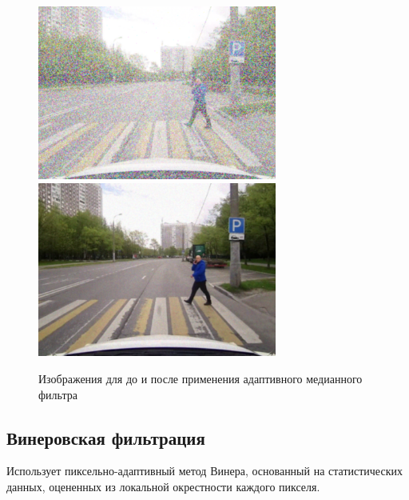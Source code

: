\begin{figure}[ht]
    \centering
    \includegraphics[width=0.7\textwidth]{../outputs/image_impulse_filter.png}
    \includegraphics[width=0.7\textwidth]{../outputs/image_quant_filter.png}
    \caption{Изображения для до и после применения адаптивного медианного фильтра}
    \label{fig:stitch_images}
\end{figure}

\pagebreak

\subsection{Винеровская фильтрация}

Использует пиксельно-адаптивный метод Винера, основанный
на статистических данных, оцененных из локальной окрестности
каждого пикселя.

